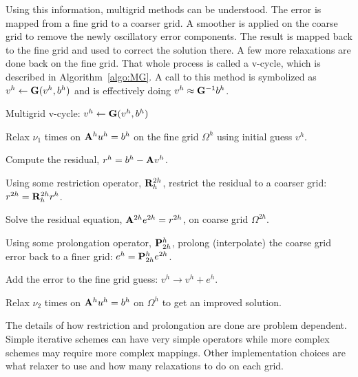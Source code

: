 Using this information, multigrid methods can be understood. The error is mapped from a fine grid to a coarser grid. A smoother is applied on the coarse grid to remove the newly oscillatory error components. The result is mapped back to the fine grid and used to correct the solution there. A few more relaxations are done back on the fine grid. That whole process is called a v-cycle, which is described in Algorithm~\ref{algo:MG}. A call to this method is symbolized as $v^h \leftarrow \mathbf{G}(v^h, b^h)$ and is effectively doing $v^{h} \approx \mathbf{G}^{-1}b^{h}$.
%
\begin{algorithm}
  \caption{ Multigrid v-cycle: $v^h \leftarrow \mathbf{G}(v^h, b^h)$}
  \label{algo:MG}
  \begin{list}{}{\hspace{2.5em}}
    \item Relax $\nu_1$ times on $\mathbf{A}^h u^h = b^h$ on the fine grid $\Omega^h$ using initial guess $v^h$.
    \item Compute the residual, $r^h = b^h - \mathbf{A} v^h$. 
    \item Using some restriction operator, $\mathbf{R}_h^{2h}$, restrict the residual to a coarser grid: $r^{2h} =  \mathbf{R}_h^{2h} r^h$. 
    \item Solve the residual equation, $\mathbf{A}^{2h} e^{2h} = r^{2h}$, on coarse grid $\Omega^{2h}$. 
    \item Using some prolongation operator, $\mathbf{P}_{2h}^h$, prolong (interpolate) the coarse grid error back to a finer grid: $e^h = \mathbf{P}_{2h}^h e^{2h}$. 
    \item Add the error to the fine grid guess: $v^h \rightarrow v^h + e^h$. 
    \item Relax $\nu_2$ times on $\mathbf{A}^h u^h = b^h$ on $\Omega^h$ to get an improved solution. 
   \end{list}
\end{algorithm}

The details of how restriction and prolongation are done are problem dependent. Simple iterative schemes can have very simple operators while more complex schemes may require more complex mappings. Other implementation choices are what relaxer to use and how many relaxations to do on each grid.

